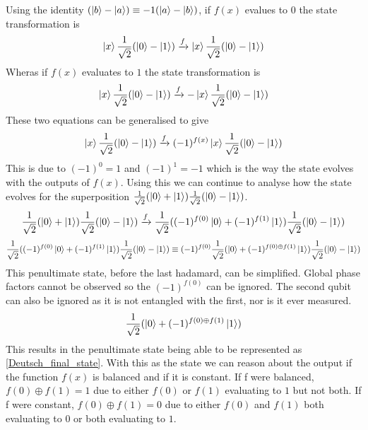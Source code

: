\documentclass[authoryearcitations]{UoYCSproject}
\begin{document}
 Using the identity $(\left\vert{b}\right\rangle-\left\vert{a}\right\rangle)\equiv-1(\left\vert{a}\right\rangle-\left\vert{b}\right\rangle)$, if $f(x)$ evalues to $0$ the state transformation is
\begin{equation*}
 \left\vert{x}\right\rangle\frac{1}{\sqrt{2}}(\left\vert{0}\right\rangle-\left\vert{1}\right\rangle) \xrightarrow{f} \left\vert{x}\right\rangle\frac{1}{\sqrt{2}}(\left\vert{0}\right\rangle-\left\vert{1}\right\rangle)
\end{equation*}
Wheras if $f(x)$ evaluates to $1$ the state transformation is
\begin{equation*}
 \left\vert{x}\right\rangle\frac{1}{\sqrt{2}}(\left\vert{0}\right\rangle-\left\vert{1}\right\rangle) \xrightarrow{f} -\left\vert{x}\right\rangle\frac{1}{\sqrt{2}}(\left\vert{0}\right\rangle-\left\vert{1}\right\rangle)
\end{equation*}
These two equations can be generalised to give
\begin{equation*}
 \left\vert{x}\right\rangle\frac{1}{\sqrt{2}}(\left\vert{0}\right\rangle-\left\vert{1}\right\rangle) \xrightarrow{f} (-1)^{f(x)}\left\vert{x}\right\rangle\frac{1}{\sqrt{2}}(\left\vert{0}\right\rangle-\left\vert{1}\right\rangle)
\end{equation*}
This is due to $(-1)^0=1$ and $(-1)^1=-1$ which is the way the state evolves with the outputs of $f(x)$.
Using this we can continue to analyse how the state evolves for the superposition $\frac{1}{\sqrt{2}}(\left\vert{0}\right\rangle+\left\vert{1}\right\rangle)\frac{1}{\sqrt{2}}(\left\vert{0}\right\rangle-\left\vert{1}\right\rangle)$.
\begin{equation*}
 \frac{1}{\sqrt{2}}(\left\vert{0}\right\rangle+\left\vert{1}\right\rangle)\frac{1}{\sqrt{2}}(\left\vert{0}\right\rangle-\left\vert{1}\right\rangle) \xrightarrow{f} \frac{1}{\sqrt{2}}((-1)^{f(0)}\left\vert{0}\right\rangle+(-1)^{f(1)}\left\vert{1}\right\rangle)\frac{1}{\sqrt{2}}(\left\vert{0}\right\rangle-\left\vert{1}\right\rangle)
\end{equation*}
\begin{equation*}
 \frac{1}{\sqrt{2}}((-1)^{f(0)}\left\vert{0}\right\rangle+(-1)^{f(1)}\left\vert{1}\right\rangle)\frac{1}{\sqrt{2}}(\left\vert{0}\right\rangle-\left\vert{1}\right\rangle) \equiv (-1)^{f(0)}\frac{1}{\sqrt{2}}(\left\vert{0}\right\rangle+(-1)^{f(0)\oplus{f(1)}}\left\vert{1}\right\rangle)\frac{1}{\sqrt{2}}(\left\vert{0}\right\rangle-\left\vert{1}\right\rangle)
\end{equation*}
This penultimate state, before the last hadamard, can be simplified.
Global phase factors cannot be observed so the $(-1)^{f(0)}$ can be ignored.
The second qubit can also be ignored as it is not entangled with the first, nor is it ever measured.
\begin{equation}
 \frac{1}{\sqrt{2}}(\left\vert{0}\right\rangle+(-1)^{f(0)\oplus{f(1)}}\left\vert{1}\right\rangle)
\label{Deutsch_final_state}
\end{equation}
This results in the penultimate state being able to be represented as \ref{Deutsch_final_state}.
With this as the state we can reason about the output if the function $f(x)$ is balanced and if it is constant.
If f were balanced, $f(0) \oplus f(1) = 1$ due to either $f(0)$ or $f(1)$ evaluating to $1$ but not both.
If f were constant, $f(0) \oplus f(1) = 0$ due to either $f(0)$ and $f(1)$ both evaluating to $0$ or both evaluating to $1$.
\end{document}
